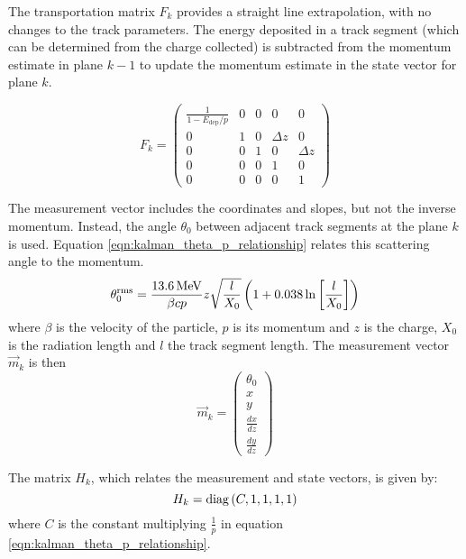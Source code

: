 The transportation matrix $F_k$ provides a straight line extrapolation, with no changes to the track parameters. The energy deposited in a track segment (which can be determined from the charge collected) is subtracted from the momentum estimate in plane $k-1$ to update the momentum estimate in the state vector for plane $k$.

\begin{equation}\label{eqn:kalman_transportation_matrix}
    F_k = \left( \begin{array}{ccccc}
    \frac{1}{1-E_{\mathrm{dep}}/p}  &   0   &   0   &   0       &   0       \\
    0                               &   1   &   0   & \Delta z  &   0       \\
    0                               &   0   &   1   &   0       & \Delta z  \\
    0                               &   0   &   0   &   1       &   0       \\
    0                               &   0   &   0   &   0       &   1
    \end{array} \right)
\end{equation}

The measurement vector includes the coordinates and slopes, but not the inverse momentum. Instead, the angle $\theta_0$ between adjacent track segments at the plane $k$ is used. Equation \eqref{eqn:kalman_theta_p_relationship} relates this scattering angle to the momentum\citep{Eidelman2004}.
\begin{equation}\label{eqn:kalman_theta_p_relationship}
    \theta_0^{\mathrm{rms}} = \frac{13.6\,\mathrm{MeV}}{\beta c p} z \sqrt{\frac{l}{X_0}} \left(1 + 0.038\ln\left[\frac{l}{X_0}\right]\right)
\end{equation}
where $\beta$ is the velocity of the particle, $p$ is its momentum and $z$ is the charge, $X_0$ is the radiation length and $l$ the track segment length. The measurement vector $\vec{m}_k$ is then
\begin{equation}\label{eqn:kalman_measurement_vector}
    \vec{m}_k = \left( \begin{array}{c} \theta_0 \\ x \\ y \\ \frac{dx}{dz} \\ \frac{dy}{dz} \end{array} \right)
\end{equation}

The matrix $H_k$, which relates the measurement and state vectors, is given by:
\begin{equation}\label{eqn:kalman_measurement_matrix}
    H_k = \mathrm{diag} \left( C, 1, 1, 1, 1 \right)
\end{equation}
where $C$ is the constant multiplying $\displaystyle \frac{1}{p}$ in equation \eqref{eqn:kalman_theta_p_relationship}.

